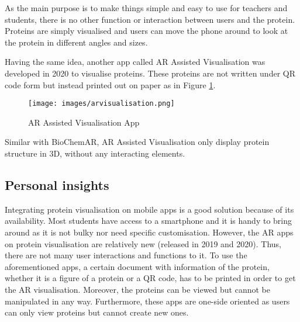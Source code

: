 As the main purpose is to make things simple and easy to use for teachers and students, there is no other function or interaction between users and the protein. Proteins are simply visualised and users can move the phone around to look at the protein in different angles and
sizes. 

Having the same idea, another app called AR Assisted Visualisation was developed in 2020 to visualise proteins. These proteins are not written under QR code form but instead printed out on paper as in Figure \ref{fig:arvisualisation}. 

\begin{figure}[!htbp]
	\centering
	\texttt{[image: images/arvisualisation.png]}
	\caption{AR Assisted Visualisation App \parencite{eriksen_visualizing_2020}}
	\label{fig:arvisualisation}
\end{figure}

Similar with BioChemAR, AR Assisted Visualisation only display protein structure in 3D, without any interacting elements. 

\subsection{Personal insights}
Integrating protein visualisation on mobile apps is a good solution because of its availability. Most students have access to a smartphone and it is handy to bring around as it is not bulky nor need specific customisation. However, the AR apps on protein visualisation are relatively
new (released in 2019 and 2020). Thus, there are not many user interactions and functions to it. To use the aforementioned apps, a certain document with information of the protein, whether it is a figure of a protein or a QR code, has to be printed in order to get the AR visualisation.
Moreover, the proteins can be viewed but cannot be manipulated in any way. Furthermore, these apps are one-side oriented as users can only view proteins but cannot create new ones.

